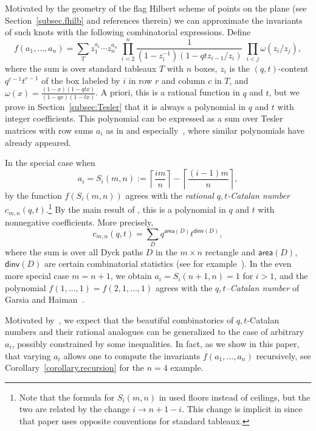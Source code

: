 \documentclass[11pt,reqno]{amsart}
\newcommand{\defn}[1]{{\color{darkred}\emph{#1}}} %
\newcommand{\area}{\mathsf{area}}
\newcommand{\dinv}{\mathsf{dinv}}
\theoremstyle{definition}
\numberwithin{equation}{section}
\begin{document}
Motivated by the geometry of the flag Hilbert scheme of points on the plane (see Section~\ref{subsec.fhilb} and 
references therein) we can approximate the invariants of such knots with the following combinatorial expressions. Define
\begin{equation}
\label{eq: def f}
	f(a_1,\ldots,a_n)=\sum_{T}z_1^{a_1}\cdots z_n^{a_n} \; \prod_{i=2}^{n} \frac{1}{(1-z_i^{-1})(1-qtz_{i-1}/z_i)}
	\; \prod_{i<j}\omega(z_i/z_j), 
\end{equation}
where the sum is over standard tableaux $T$ with $n$ boxes, $z_i$ is the $(q,t)$-content $q^{c-1} t^{r-1}$
of the box labeled by $i$ in row $r$ and column $c$ in $T$, and $\omega(x)=\frac{(1-x)(1-qtx)}{(1-qx)(1-tx)}$. A priori, 
this is a rational function in $q$ and $t$, but we prove 
in Section~\ref{subsec:Tesler} that it is always a polynomial in $q$ and $t$ with integer coefficients. This polynomial can 
be expressed as a sum over Tesler matrices with row sums $a_i$ as in  \cite{GN.2015} and 
especially~\cite{AGHRS.2012}, where similar polynomials have already appeared. 

In the special case when 
\[
	a_i=S_{i}(m,n):=  \left \lceil \frac{im}{n} \right \rceil - \left \lceil \frac{(i-1)m}{n} \right \rceil,
\]
by \cite{GN.2015} the function $f(S_{i}(m,n))$ agrees with the \defn{rational $q,t$-Catalan number} $c_{m,n}(q,t)$.\footnote{Note that the formula for $S_i(m,n)$ in \cite{GN.2015} used floors instead of ceilings, but the two are related by the change $i\to n+1-i$. This change is implicit in \cite{GN.2015} since that paper uses opposite conventions for standard tableaux.}
By the main result of \cite{Mellit.2016}, this is a polynomial in $q$ and $t$ with nonnegative coefficients. More precisely, 
\[
	c_{m,n}(q,t)=\sum_{D}q^{\area(D)}t^{\dinv(D)},
\]
where the sum is over all Dyck paths $D$ in the $m\times n$ rectangle and $\area(D)$, $\dinv(D)$ are certain 
combinatorial statistics (see for example~\cite{Haglund.2008}). In the even more special case $m=n+1$, we obtain 
$a_i=S_i(n+1,n)=1$ for $i>1$, and the polynomial $f(1,\ldots,1)=f(2,1,\ldots,1)$ agrees with the
\defn{$q,t$--Catalan number} of Garsia and Haiman~\cite{GarsiaHaiman.1996}. 

Motivated by~\cite{GNR.2016,OR.2017}, we expect that the beautiful combinatorics of $q,t$-Catalan numbers and 
their rational analogues can be generalized to the case of arbitrary $a_i$, possibly constrained by some inequalities. 
In fact, as we show in this paper, that varying $a_i$ allows one to compute the invariants $f(a_1,\ldots,a_n)$ recursively, 
see Corollary~\ref{corollary.recursion} for the $n=4$ example. 
\end{document}
